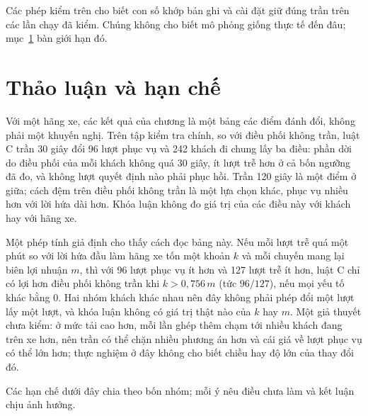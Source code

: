 Các phép kiểm trên cho biết con số khớp bản ghi và cài đặt giữ đúng trần trên các lần chạy đã kiểm. Chúng không cho
biết mô phỏng giống thực tế đến đâu; mục~\ref{muc:c4-thaoluan} bàn giới hạn đó.

\section{Thảo luận và hạn chế}
\label{muc:c4-thaoluan}

Với một hãng xe, các kết quả của chương là một bảng các điểm đánh đổi, không phải một khuyến nghị. Trên tập kiểm
tra chính, so với điều phối không trần, luật C trần 30 giây đổi 96 lượt phục vụ và 242 khách đi chung lấy ba điều:
phần dời do điều phối của mỗi khách không quá 30 giây, ít lượt trễ hơn ở cả bốn ngưỡng đã đo, và không lượt quyết
định nào phải phục hồi. Trần 120 giây là một điểm ở giữa; cách đệm trên điều phối không trần là một lựa chọn khác,
phục vụ nhiều hơn với lời hứa dài hơn. Khóa luận không đo giá trị của các điều này với khách hay với hãng xe.

Một phép tính giả định cho thấy cách đọc bảng này. Nếu mỗi lượt trễ quá một phút so với lời hứa đầu làm hãng xe tốn
một khoản $k$ và mỗi chuyến mang lại biên lợi nhuận $m$, thì với 96 lượt phục vụ ít hơn và 127 lượt trễ ít hơn, luật
C chỉ có lợi hơn điều phối không trần khi $k > 0{,}756\,m$ (tức $96/127$), nếu mọi yếu tố khác bằng 0. Hai nhóm
khách khác nhau nên đây không phải phép đổi một lượt lấy một lượt, và khóa luận không có giá trị thật nào của $k$ hay
$m$. Một giả thuyết chưa kiểm: ở mức tải cao hơn, mỗi lần ghép thêm chạm tới nhiều khách đang trên xe hơn, nên trần
có thể chặn nhiều phương án hơn và cái giá về lượt phục vụ có thể lớn hơn; thực nghiệm ở đây không cho biết chiều
hay độ lớn của thay đổi đó.

Các hạn chế dưới đây chia theo bốn nhóm; mỗi ý nêu điều chưa làm và kết luận chịu ảnh hưởng.

